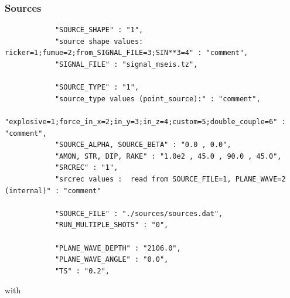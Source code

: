 \documentclass[11pt,onecolumn,oneside]{article}
\begin{document}
\subsubsection{Sources}
\label{Sources}
\begin{verbatim}
            "SOURCE_SHAPE" : "1",
            "source shape values: ricker=1;fumue=2;from_SIGNAL_FILE=3;SIN**3=4" : "comment",
            "SIGNAL_FILE" : "signal_mseis.tz",

            "SOURCE_TYPE" : "1",
            "source_type values (point_source):" : "comment",
            "explosive=1;force_in_x=2;in_y=3;in_z=4;custom=5;double_couple=6" : "comment",
            "SOURCE_ALPHA, SOURCE_BETA" : "0.0 , 0.0",
            "AMON, STR, DIP, RAKE" : "1.0e2 , 45.0 , 90.0 , 45.0",
            "SRCREC" : "1",
            "srcrec values :  read from SOURCE_FILE=1, PLANE_WAVE=2 (internal)" : "comment"
            
            "SOURCE_FILE" : "./sources/sources.dat", 
            "RUN_MULTIPLE_SHOTS" : "0", 
            
            "PLANE_WAVE_DEPTH" : "2106.0",
            "PLANE_WAVE_ANGLE" : "0.0",
            "TS" : "0.2",
\end{verbatim}

with
\end{document}
